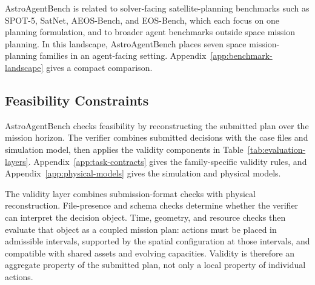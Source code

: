 \documentclass[]{mosi}
\begin{document}
AstroAgentBench is related to solver-facing satellite-planning benchmarks such as SPOT-5, SatNet, AEOS-Bench, and EOS-Bench, which each focus on one planning formulation, and to broader agent benchmarks outside space mission planning. In this landscape, AstroAgentBench places seven space mission-planning families in an agent-facing setting. Appendix~\ref{app:benchmark-landscape} gives a compact comparison.

\subsection{Feasibility Constraints}
\label{sec:feasibility-constraints}

AstroAgentBench checks feasibility by reconstructing the submitted plan over the mission horizon. The verifier combines submitted decisions with the case files and simulation model, then applies the validity components in Table~\ref{tab:evaluation-layers}. Appendix~\ref{app:task-contracts} gives the family-specific validity rules, and Appendix~\ref{app:physical-models} gives the simulation and physical models.

The validity layer combines submission-format checks with physical reconstruction. File-presence and schema checks determine whether the verifier can interpret the decision object. Time, geometry, and resource checks then evaluate that object as a coupled mission plan: actions must be placed in admissible intervals, supported by the spatial configuration at those intervals, and compatible with shared assets and evolving capacities. Validity is therefore an aggregate property of the submitted plan, not only a local property of individual actions.
\end{document}
